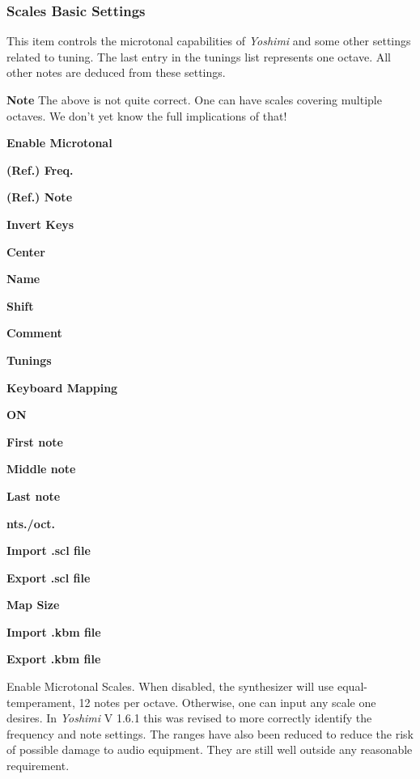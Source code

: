 \subsubsection{Scales Basic Settings}
\label{subsubsec:scales_basic_settings}

   This item controls the microtonal capabilities of \textsl{Yoshimi} and
   some other settings related to tuning.
   The last entry in the tunings list represents one octave.
   All other notes are deduced from these settings.

   \textbf{Note}
   The above is not quite correct. One can have scales covering
   multiple octaves. We don't yet know the full implications of that!

   \begin{enumber}
      \item \textbf{Enable Microtonal}
      \item \textbf{(Ref.) Freq.}
      \item \textbf{(Ref.) Note}
      \item \textbf{Invert Keys}
      \item \textbf{Center}
      \item \textbf{Name}
      \item \textbf{Shift}
      \item \textbf{Comment}
      \item \textbf{Tunings}
      \item \textbf{Keyboard Mapping}
      \item \textbf{ON}
      \item \textbf{First note}
      \item \textbf{Middle note}
      \item \textbf{Last note}
      \item \textbf{nts./oct.}
      \item \textbf{Import .scl file}
      \item \textbf{Export .scl file}
      \item \textbf{Map Size}
      \item \textbf{Import .kbm file}
      \item \textbf{Export .kbm file}
   \end{enumber}

   \setcounter{ItemCounter}{0}      %

   Enable Microtonal Scales.
   When disabled, the synthesizer will use equal-temperament, 12 notes per
   octave.  Otherwise, one can input any scale one desires.
   In \textsl{Yoshimi} V 1.6.1 this was revised to more correctly identify
   the frequency and note settings. The ranges have also been reduced to
   reduce the risk of possible damage to audio equipment. They are still
   well outside any reasonable requirement.

